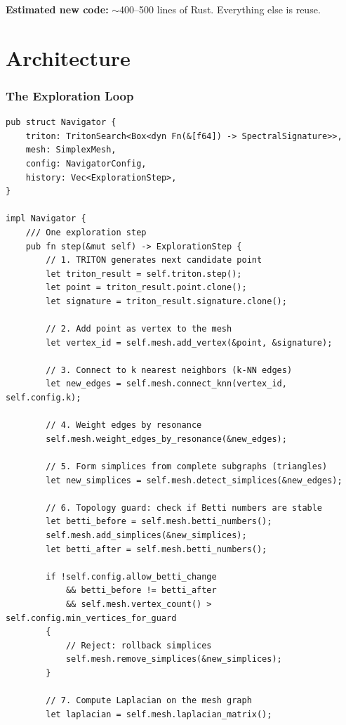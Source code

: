 \documentclass[11pt,a4paper,twoside]{article}
\theoremstyle{definition}
\theoremstyle{plain}
\theoremstyle{remark}
\begin{document}
\textbf{Estimated new code:} $\sim$400--500 lines of Rust.
Everything else is reuse.


\part{Architecture}\label{part:arch}

\section{The Exploration Loop}\label{sec:loop}

\begin{lstlisting}[title={The complete loop}]
pub struct Navigator {
    triton: TritonSearch<Box<dyn Fn(&[f64]) -> SpectralSignature>>,
    mesh: SimplexMesh,
    config: NavigatorConfig,
    history: Vec<ExplorationStep>,
}

impl Navigator {
    /// One exploration step
    pub fn step(&mut self) -> ExplorationStep {
        // 1. TRITON generates next candidate point
        let triton_result = self.triton.step();
        let point = triton_result.point.clone();
        let signature = triton_result.signature.clone();

        // 2. Add point as vertex to the mesh
        let vertex_id = self.mesh.add_vertex(&point, &signature);

        // 3. Connect to k nearest neighbors (k-NN edges)
        let new_edges = self.mesh.connect_knn(vertex_id, self.config.k);

        // 4. Weight edges by resonance
        self.mesh.weight_edges_by_resonance(&new_edges);

        // 5. Form simplices from complete subgraphs (triangles)
        let new_simplices = self.mesh.detect_simplices(&new_edges);

        // 6. Topology guard: check if Betti numbers are stable
        let betti_before = self.mesh.betti_numbers();
        self.mesh.add_simplices(&new_simplices);
        let betti_after = self.mesh.betti_numbers();

        if !self.config.allow_betti_change
            && betti_before != betti_after
            && self.mesh.vertex_count() > self.config.min_vertices_for_guard
        {
            // Reject: rollback simplices
            self.mesh.remove_simplices(&new_simplices);
        }

        // 7. Compute Laplacian on the mesh graph
        let laplacian = self.mesh.laplacian_matrix();


\end{lstlisting}
\end{document}
